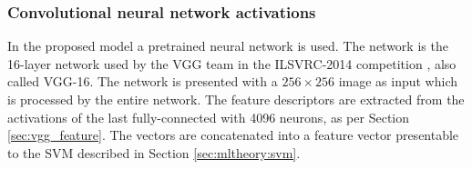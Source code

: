 
\subsubsection{Convolutional neural network activations}
\label{sec:meth:featextr:cnn}

In the proposed model a pretrained neural network is used. The network is the 16-layer network used by the VGG team in the ILSVRC-2014 competition \cite{simonyan2014very}, also called VGG-16. The network is presented with a $256\times256$ image as input which is processed by the entire network. The feature descriptors are extracted from the activations of the last fully-connected with 4096 neurons, as per Section \ref{sec:vgg_feature}. The vectors are concatenated into a feature vector presentable to the SVM described in Section \ref{sec:mltheory:svm}. 
